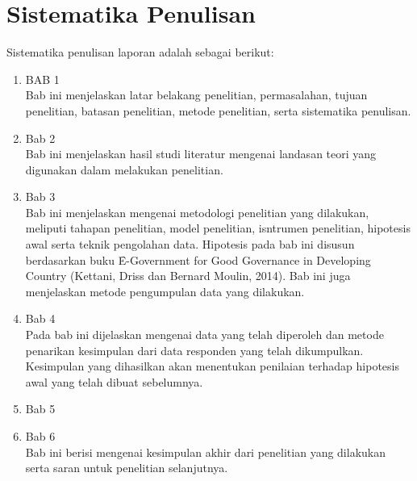 \section{Sistematika Penulisan}
Sistematika penulisan laporan adalah sebagai berikut:
\begin{enumerate}
	\item BAB 1 \babSatu \\
	Bab ini menjelaskan latar belakang penelitian, permasalahan, tujuan penelitian, batasan penelitian, metode penelitian, serta sistematika penulisan. 
	\item Bab 2 \babDua \\
	Bab ini menjelaskan hasil studi literatur mengenai landasan teori yang digunakan dalam melakukan penelitian.
	\item Bab 3 \babTiga \\
	Bab ini menjelaskan mengenai metodologi penelitian yang dilakukan, meliputi tahapan penelitian, model penelitian, isntrumen penelitian, hipotesis awal serta teknik pengolahan data. Hipotesis pada bab ini disusun berdasarkan buku \f{E-Government for Good Governance in Developing Country} (Kettani, Driss dan Bernard Moulin, 2014). Bab ini juga menjelaskan metode pengumpulan data yang dilakukan.
	\item Bab 4 \babEmpat \\
	Pada bab ini dijelaskan mengenai data yang telah diperoleh dan metode penarikan kesimpulan dari data responden yang telah dikumpulkan. Kesimpulan yang dihasilkan akan menentukan penilaian terhadap hipotesis awal yang telah dibuat sebelumnya.
	\item Bab 5 \babLima \\
	\item Bab 6 \babEnam \\
	Bab ini berisi mengenai kesimpulan akhir dari penelitian yang dilakukan serta saran untuk penelitian selanjutnya.
\end{enumerate}
